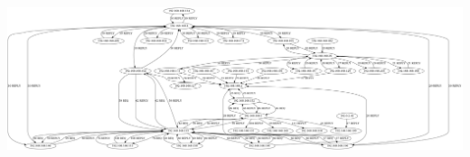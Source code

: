 \begin{center}
\includegraphics[angle=90,scale=0.2]{./graficos/grafos-arp/grafo_laburo_eze2.png}
\end{center}